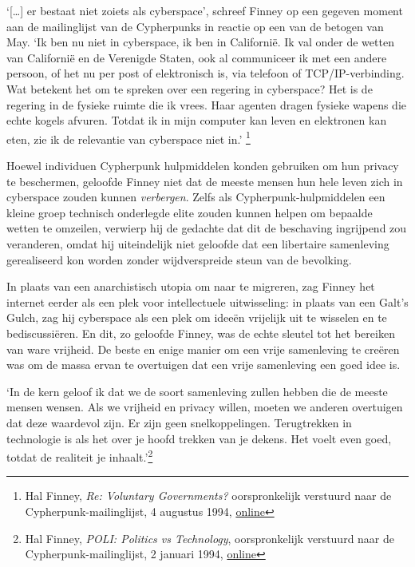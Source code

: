 \documentclass[
  a5paper,
  smalldemyvopaper,11pt,twoside,onecolumn,openright,extrafontsizes,
hidelinks]{memoir}
\renewenvironment{quote}%
               {\list{}{\rightmargin=.3cm\leftmargin=.3cm}%
                \itshape \item[]}%
               {\endlist}
\begin{document}
`{[}\ldots{]} er bestaat niet zoiets als cyberspace', schreef Finney op
een gegeven moment aan de mailinglijst van de Cypherpunks in reactie op
een van de betogen van May. `Ik ben nu niet in cyberspace, ik ben in
Californië. Ik val onder de wetten van Californië en de Verenigde
Staten, ook al communiceer ik met een andere persoon, of het nu per post
of elektronisch is, via telefoon of TCP/IP-verbinding. Wat betekent het
om te spreken over een regering in cyberspace? Het is de regering in de
fysieke ruimte die ik vrees. Haar agenten dragen fysieke wapens die
echte kogels afvuren. Totdat ik in mijn computer kan leven en elektronen
kan eten, zie ik de relevantie van cyberspace niet in.' \footnote{Hal
  Finney, \emph{Re: Voluntary Governments?} oorspronkelijk verstuurd
  naar de Cypherpunk-mailinglijst, 4 augustus 1994,
  \href{https://cypherpunks.venona.com/date/1994/08/msg00239.html}{online}}

Hoewel individuen Cypherpunk hulpmiddelen konden gebruiken om hun
privacy te beschermen, geloofde Finney niet dat de meeste mensen hun
hele leven zich in cyberspace zouden kunnen \emph{verbergen}. Zelfs als
Cypherpunk-hulpmiddelen een kleine groep technisch onderlegde elite
zouden kunnen helpen om bepaalde wetten te omzeilen, verwierp hij de
gedachte dat dit de beschaving ingrijpend zou veranderen, omdat hij
uiteindelijk niet geloofde dat een libertaire samenleving gerealiseerd
kon worden zonder wijdverspreide steun van de bevolking.

In plaats van een anarchistisch utopia om naar te migreren, zag Finney
het internet eerder als een plek voor intellectuele uitwisseling: in
plaats van een Galt's Gulch, zag hij cyberspace als een plek om ideeën
vrijelijk uit te wisselen en te bediscussiëren. En dit, zo geloofde
Finney, was de echte sleutel tot het bereiken van ware vrijheid. De
beste en enige manier om een vrije samenleving te creëren was om de
massa ervan te overtuigen dat een vrije samenleving een goed idee is.

\begin{quote}
`In de kern geloof ik dat we de soort samenleving zullen hebben die de
meeste mensen wensen. Als we vrijheid en privacy willen, moeten we
anderen overtuigen dat deze waardevol zijn. Er zijn geen
snelkoppelingen. Terugtrekken in technologie is als het over je hoofd
trekken van je dekens. Het voelt even goed, totdat de realiteit je
inhaalt.'\footnote{Hal Finney, \emph{POLI: Politics vs Technology},
  oorspronkelijk verstuurd naar de Cypherpunk-mailinglijst, 2 januari
  1994,
  \href{https://cypherpunks.venona.com/date/1994/01/msg00014.html}{online}}
\end{quote}
\end{document}

